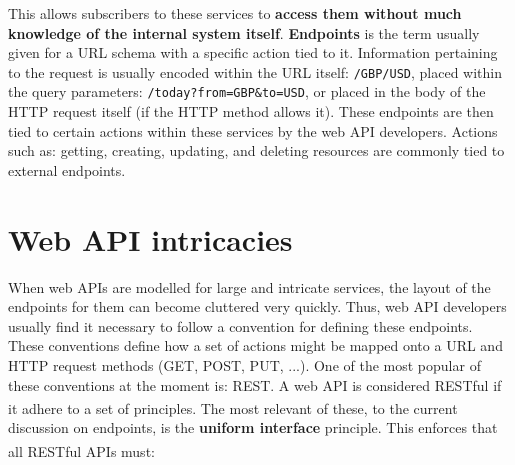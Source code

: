 \documentclass[]{full}
\theoremstyle{definition}
\begin{document}
This allows subscribers to these services to \textbf{access them without much knowledge of the internal system itself}. \textbf{Endpoints} is the term usually given for a URL schema with a specific action tied to it. Information pertaining to the request is usually encoded within the URL itself: \verb|/GBP/USD|, placed within the query parameters: \verb|/today?from=GBP&to=USD|, or placed in the body of the HTTP request itself (if the HTTP method allows it). These endpoints are then tied to certain actions within these services by the web API developers. Actions such as: getting, creating, updating, and deleting resources are commonly tied to external endpoints.

\section{Web API intricacies}

When web APIs are modelled for large and intricate services, the layout of the endpoints for them can become cluttered very quickly. Thus, web API developers usually find it necessary to follow a convention for defining these endpoints. These conventions define how a set of actions might be mapped onto a URL and HTTP request methods (GET, POST, PUT, ...). One of the most popular of these conventions at the moment is: REST. A web API is considered RESTful if it adhere to a set of principles\textsuperscript{\cite{richardson_ruby_2007}}. The most relevant of these, to the current discussion on endpoints, is the \textbf{uniform interface} principle. This enforces that all RESTful APIs must\textsuperscript{\cite{fielding_2000}}:

\end{document}
